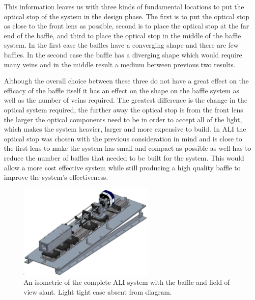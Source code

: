 This information leaves us with three kinds of fundamental locations to put the optical stop of the system in the design phase. The first is to put the optical stop as close to the front lens as possible, second is to place the optical stop at the far end of the baffle, and third to place the optical stop in the middle of the baffle system. In the first case the baffles have a  converging shape and there are few baffles. In the second case the baffle has a diverging shape which would require many veins and in the middle result a medium between previous two results.

Although the overall choice between these three do not have a great effect on the efficacy of the baffle itself it has an effect on the shape on the baffle system as well as the number of veins required. The greatest difference is the change in the optical system required, the further away the optical stop is from the front lens the larger the optical components need to be in order to accept all of the light, which makes the system heavier, larger and more expensive to build. In ALI the optical stop was chosen with the previous consideration in mind and is close to the first lens to make the system has small and compact as possible as well has to reduce the number of baffles that needed to be built for the system. This would allow a more cost effective system while still producing a high quality baffle to improve the system's effectiveness.

\begin{figure}
        \centering
        \includegraphics[width=0.6\textwidth]{./Images/3-3-AliCompleteDesign.pdf}
        \caption[ALI Complete Optical Design (Isometric)]{An isometric of the complete ALI system with the baffle and field of view slant. Light tight case absent from diagram.}
        \label{fig:3.3:aliSystemDiagram}
\end{figure}

